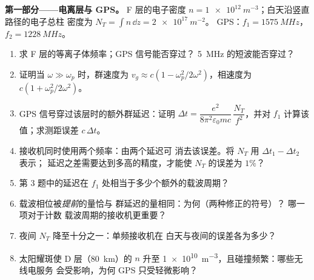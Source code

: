 \begin{problem}
\label{pb:b2:waves-in-media:1}

\medskip
\noindent\textbf{第一部分——电离层与 GPS。}
F 层的电子密度 $n = \qty{1e12}{m^{-3}}$；白天沿竖直路径的电子总柱
密度为 $N_T = \int n\,\dd z = \qty{2e17}{m^{-2}}$。
GPS：$f_1 = \qty{1575}{MHz}$，$f_2 = \qty{1228}{MHz}$。
\begin{enumerate}
  \item 求 F 层的等离子体频率；GPS 信号能否穿过？
        \qty{5}{MHz} 的短波能否穿过？
  \item 证明当 $\omega \gg \omega_p$ 时，群速度为 $v_g \approx c(1 -
        \omega_p^2/2\omega^2)$，相速度为 $c(1 + \omega_p^2/2\omega^2)$。
  \item GPS 信号穿过该层时的额外群延迟：证明
        $\Delta t = \dfrac{e^2}{8\pi^2\varepsilon_0mc}\,\dfrac{N_T}{f^2}$，并对
        $f_1$ 计算该值；求测距误差 $c\,\Delta t$。
  \item 接收机同时使用两个频率：由两个延迟可
        消去该误差。将 $N_T$ 用 $\Delta t_1 - \Delta t_2$ 表示；
        延迟之差需要达到多高的精度，才能使 $N_T$ 的误差为 $1\%$？
  \item 第 3 题中的延迟在
        $f_1$ 处相当于多少个额外的载波周期？
  \item 载波相位被\emph{提前}的量恰与
        群延迟的量相同：为何（两种修正的符号）？
        哪一项对于计数
        载波周期的接收机更重要？
  \item 夜间 $N_T$ 降至十分之一：单频接收机在
        白天与夜间的误差各为多少？
  \item 太阳耀斑使 D 层（\qty{80}{km}）的 $n$ 升至
        \qty{1e10}{m^{-3}}，且碰撞频繁：哪些无线电服务
        会受影响，为何 GPS 只受轻微影响？
\end{enumerate}


\end{problem}
